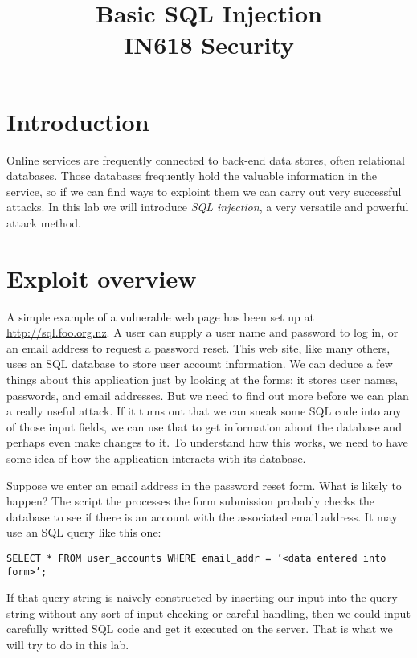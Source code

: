\documentclass{article}
\begin{document}
\title{Basic SQL Injection\\ IN618 Security}
\date{}
\maketitle

\section*{Introduction}
Online services are frequently connected to back-end data stores, often relational databases. Those databases frequently hold the valuable information in the service, so if we can find ways to exploint them we can carry out very successful attacks. In this lab we will introduce \emph{SQL injection}, a very versatile and powerful attack method.

\section{Exploit overview}
A simple example of a vulnerable web page has been set up at \url{http://sql.foo.org.nz}. A user can supply a user name and password to log in, or an email address to request a password reset. This web site, like many others, uses an SQL database to store user account information. We can deduce a few things about this application just by looking at the forms: it stores user names, passwords, and email addresses. But we need to find out more before we can plan a really useful attack. If it turns out that we can sneak some SQL code into any of those input fields, we can use that to get information about the database and perhaps even make changes to it.  To understand how this works, we need to have some idea of how the application interacts with its database.

Suppose we enter an email address in the password reset form. What is likely to happen? The script the processes the form submission probably checks the database to see if there is an account with the associated email address. It may use an SQL query like this one:

\texttt{SELECT * FROM user\_accounts WHERE email\_addr = '<data entered into form>';}


If that query string is naively constructed by inserting our input into the query string without any sort of input checking or careful handling, then we could input carefully writted SQL code and get it executed on the server.  That is what we will try to do in this lab.
\end{document}
